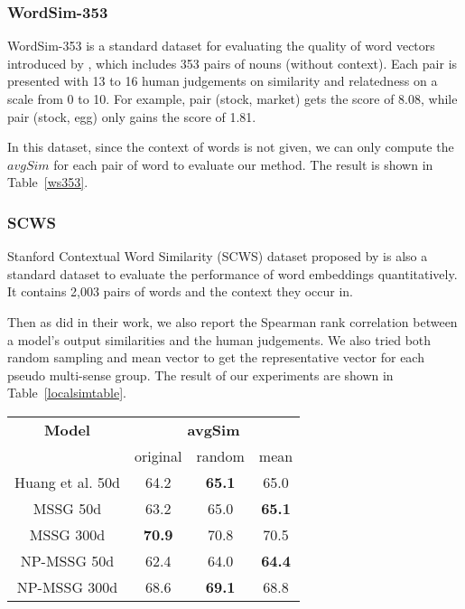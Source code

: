 \documentclass[11pt]{article}
\begin{document}
\subsubsection{WordSim-353}
\par
WordSim-353 is a standard dataset for evaluating the quality of word vectors introduced by , which includes 353 pairs of nouns (without context). Each pair is presented with 13 to 16 human judgements on similarity and relatedness on a scale from 0 to 10. For example, pair (stock, market) gets the score of 8.08, while pair (stock, egg) only gains the score of 1.81. 
\par
In this dataset, since the context of words is not given, we can only compute the $avgSim$ for each pair of word to evaluate our method. The result is shown in Table~\ref{ws353}.
\subsubsection{SCWS}
\par
Stanford Contextual Word Similarity (SCWS) dataset proposed by  is also a standard dataset to evaluate the performance of word embeddings quantitatively. It contains 2,003 pairs of words and the context they occur in. 

\par
Then as  did in their work, we also report the Spearman rank correlation between a model's output similarities and the human judgements. We also tried both random sampling and mean vector to get the representative vector for each pseudo multi-sense group. The result of our experiments are shown in Table~\ref{localsimtable}.
 \begin{center}
 \begin{tabular}{|c|ccc|}
 \hline
 \multirow{1}{*}{\textbf{Model}} &\multicolumn{3}{c|}{\textbf{avgSim}} \\
 & original & random & mean\\
 \hline 
 Huang et al. 50d & 64.2& \textbf{65.1} & 65.0\\
 MSSG 50d &  63.2& 65.0 & \textbf{65.1}  \\
 MSSG 300d & \textbf{70.9} & 70.8 & 70.5\\
 NP-MSSG 50d & 62.4 & 64.0 & \textbf{64.4} \\
 NP-MSSG 300d & 68.6 & \textbf{69.1} & 68.8\\
 \hline
 \end{tabular}
 \end{center}
 
\end{document}
